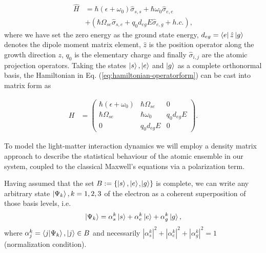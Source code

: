 \documentclass[]{spie}  %
\def\h{\hat}
\begin{document}
 \begin{align}
 \label{eq:hamiltonian-operatorform}
 \h{H} &= \hbar(\epsilon + \omega_0) \h\sigma_{s,s} +\hbar\omega_0\h\sigma_{e,e}  \nonumber \\ 
 & +(\hbar\Omega_{se}\h\sigma_{s,e} +q_0d_{eg}E\h\sigma_{e,g}+h.c.),
 \end{align}
 where we have set the zero energy as the ground state energy, $d_{eg}=\Bra{e}\h z \Ket{g}$  denotes the dipole moment matrix element, $\h z$ is the position operator along the growth direction $z$, $q_0$ is the elementary charge and finally $\h \sigma_{i,j}$ are the atomic projection operators. Taking the states $\Ket{s},\Ket{e}$ and $\Ket{g}$ as a complete orthonormal basis,  the Hamiltonian in Eq. (\ref{eq:hamiltonian-operatorform}) can be cast into matrix form as
 
 \begin{align}
 \label{eq:hamiltonian-matrixform}
 H &= \begin{pmatrix}
 \hbar(\epsilon + \omega_0) & \hbar \Omega_{se} & 0 \\ 
 \hbar \Omega_{se} & \hbar\omega_0 & q_0d_{eg}E \\
 0 & q_0d_{eg}E & 0
 \end{pmatrix}.
 \end{align}
 
 To model the light-matter interaction dynamics we will employ a density matrix approach to describe the statistical behaviour of the atomic ensemble in our system, coupled to the classical Maxwell's equations via a polarization term. 
 
 Having assumed that the set $B:= \{\Ket{s},\Ket{e}$,$\Ket{g}\}$ is complete, we can write any arbitrary state $\Ket{\Psi_k}, k = 1,2,3$ of the electron as a coherent superposition of those basis levels, i.e. 
 \begin{equation}
 \Ket{\Psi_k} = \alpha_s^k \Ket{s} + \alpha_{e}^k\Ket{e} + \alpha_g^k\Ket{g}, 
 \end{equation}
 where $\alpha_j^k = \braket{j|\Psi_k}, \Ket{j} \in B$ and necessarily $|\alpha_s^k|^2+|\alpha_e^k|^2+|\alpha_g^k|^2 = 1$ (normalization condition). 
 
\end{document}
